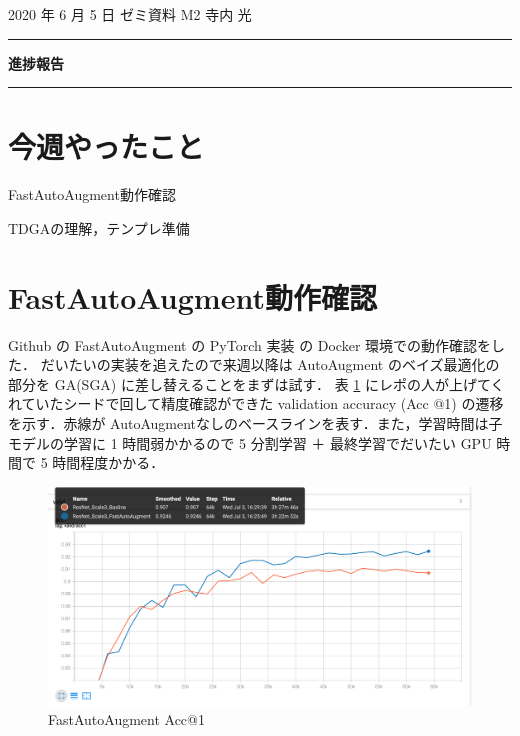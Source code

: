 \documentclass[onecolumn]{ujarticle}   %
\begin{document}
	\noindent

	\hspace{1em}
	2020 年 6 月 5 日
	ゼミ資料
	\hfill
	M2 寺内 光

	\vspace{2mm}

	\hrule

	\begin{center}
		{\Large \bf 進捗報告}
	\end{center}

	\hrule
	\vspace{3mm}

	\section{今週やったこと}
	\begin{itemize}{
		\item{FastAutoAugment動作確認}
		\item{TDGAの理解，テンプレ準備}
	}\end{itemize}

	\section{FastAutoAugment動作確認}
	Github の FastAutoAugment の PyTorch 実装 \cite{fastautoaugument} の Docker 環境での動作確認をした．
	だいたいの実装を追えたので来週以降は AutoAugment のベイズ最適化の部分を GA(SGA) に差し替えることをまずは試す．
	表 \ref{fig:FasetAutoAugment-accuracy} にレポの人が上げてくれていたシードで回して精度確認ができた validation accuracy (Acc @1) の遷移を示す．赤線が AutoAugmentなしのベースラインを表す．また，学習時間は子モデルの学習に 1 時間弱かかるので 5 分割学習 ＋ 最終学習でだいたい GPU 時間で 5 時間程度かかる．

	\begin{figure}[h]
		\begin{center}
			\includegraphics[width=\columnwidth]{resnet20_valid.png}
			\caption{FastAutoAugment Acc@1}
			\label{fig:FasetAutoAugment-accuracy}
		\end{center}
	\end{figure}
\end{document}
